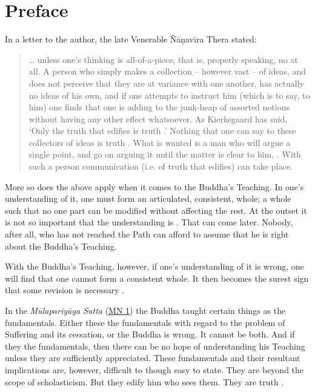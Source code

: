 \chapter{Preface}

In a letter to the author, the late Venerable Ñāṇavīra Thera stated:

\begin{quote}
\ldots{} unless one's thinking is all-of-a-piece, that is, properly speaking, no  at all. A person who simply makes a collection -- however vast -- of ideas, and does not perceive that they are at variance with one another, has actually no ideas of his own, and if one attempts to instruct him (which is to say, to  him) one finds that one is adding to the junk-heap of assorted notions without having any other effect whatsoever. As Kierkegaard has said, `Only the truth that edifies is truth .' Nothing that one can say to these collectors of ideas is truth . What is wanted is a man who will argue a single point, and go on arguing it until the matter is clear to him, . With such a person communication (i.e. of truth that edifies) can take place.
\end{quote}

More so does the above apply when it comes to the Buddha's Teaching. In one's understanding of it, one must form an articulated, consistent, whole; a whole such that no one part can be modified without affecting the rest. At the outset it is not so important that the understanding is . That can  come later. Nobody, after all, who has not reached the Path can afford to assume that he is right about the Buddha's Teaching.

With the Buddha's Teaching, however, if one's understanding of it is wrong, one will find that one cannot form a consistent whole. It then becomes the surest sign that some revision is necessary .

In the \emph{Mūlapariyāya Sutta} (\href{https://suttacentral.net/mn1/en/bodhi}{MN 1}) the Buddha taught certain things as the fundamentals. Either these  the fundamentals with regard to the problem of Suffering and its cessation, or the Buddha is wrong. It cannot be both. And if they  the fundamentals, then there can be no hope of understanding his Teaching unless they are sufficiently appreciated. These fundamentals and their resultant implications are, however, difficult to  though easy to state. They are beyond the scope of scholasticism. But they edify him who sees them. They are truth .

